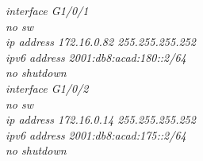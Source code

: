 \documentclass[12pt,a4paper]{report}
\begin{document}
\hspace*{2cm}\textit{interface G1/0/1\\
\hspace*{2cm}no sw\\
\hspace*{2cm}ip address 172.16.0.82 255.255.255.252\\
\hspace*{2cm}ipv6 address 2001:db8:acad:180::2/64\\
\hspace*{2cm}no shutdown\\
\hspace*{2cm}interface G1/0/2\\
\hspace*{2cm}no sw\\
\hspace*{2cm}ip address 172.16.0.14 255.255.255.252\\
\hspace*{2cm}ipv6 address 2001:db8:acad:175::2/64\\
\hspace*{2cm}no shutdown\\}
\end{document}
